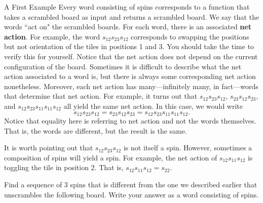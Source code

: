 \begin{section}{A First Example}
Every word consisting of spins corresponds to a function that takes a scrambled board as input and returns a scrambled board. We say that the words ``act on" the scrambled boards. For each word, there is an associated \textbf{net action}. For example, the word $s_{12} s_{23} s_{12}$ corresponds to swapping the positions but not orientation of the tiles in positions 1 and 3.  You should take the time to verify this for yourself. Notice that the net action does not depend on the current configuration of the board. Sometimes it is difficult to describe what the net action associated to a word is, but there is always some corresponding net action nonetheless. Moreover, each net action has many---infinitely many, in fact---words that determine that net action. For example, it turns out that $s_{12}s_{23}s_{12}$, $s_{23}s_{12}s_{23}$, and $s_{12}s_{23}s_{11}s_{11}s_{12}$ all yield the same net action.   In this case, we would write
\[
s_{12}s_{23}s_{12}=s_{23}s_{12}s_{23}=s_{12}s_{23}s_{11}s_{11}s_{12}.
\]
Notice that equality here is referring to net action and not the words themselves.  That is, the words are different, but the result is the same.

It is worth pointing out that $s_{12} s_{23} s_{12}$ is not itself a spin.  However, sometimes a composition of spins will yield a spin.  For example, the net action of $s_{12} s_{11} s_{12}$ is toggling the tile in position 2.  That is, $s_{12} s_{11} s_{12}=s_{22}$.

\begin{problem}\label{prob:3_different_spins}
Find a sequence of 3 spins that is different from the one we described earlier that unscrambles the following board. Write your answer as a word consisting of spins.
\begin{center}
\end{center}
\end{problem}


\end{section}
